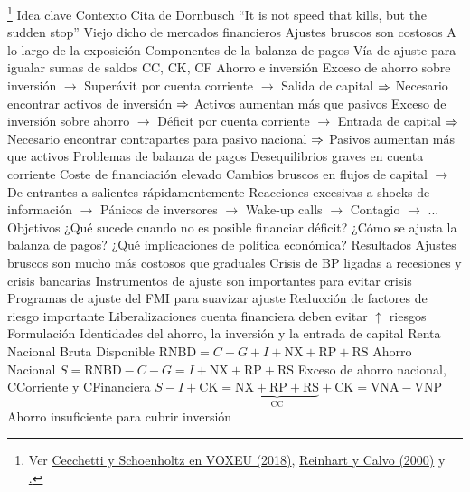 \documentclass{nuevotema}
\begin{document}
\begin{esquemal}
	\1 \footnote{Ver \href{https://voxeu.org/content/sudden-stops-primer-balance-payments-crises}{Cecchetti y Schoenholtz en VOXEU (2018)}, \href{https://mpra.ub.uni-muenchen.de/6982/1/MPRA_paper_6982.pdf}{Reinhart y Calvo (2000)} y \href{https://ideas.repec.org/p/wbk/wbrwps/7639.html} .}
		\2 Idea clave
			\3 Contexto
				\4 Cita de Dornbusch
				\4[] ``It is not speed that kills, but the sudden stop''
				\4[] Viejo dicho de mercados financieros
				\4 Ajustes bruscos son costosos
				\4 A lo largo de la exposición
				\4[] Componentes de la balanza de pagos
				\4[] Vía de ajuste para igualar sumas de saldos CC, CK, CF
				\4 Ahorro e inversión
				\4[] Exceso de ahorro sobre inversión
				\4[] $\to$ Superávit por cuenta corriente
				\4[] $\to$ Salida de capital
				\4[] $\Rightarrow$ Necesario encontrar activos de inversión
				\4[] $\Rightarrow$ Activos aumentan más que pasivos
				\4[] Exceso de inversión sobre ahorro
				\4[] $\to$ Déficit por cuenta corriente
				\4[] $\to$ Entrada de capital
				\4[] $\Rightarrow$ Necesario encontrar contrapartes para pasivo nacional
				\4[] $\Rightarrow$ Pasivos aumentan más que activos
				\4 Problemas de balanza de pagos
				\4[] Desequilibrios graves en cuenta corriente
				\4[] Coste de financiación elevado
				\4[] Cambios bruscos en flujos de capital
				\4[] $\to$ De entrantes a salientes rápidamentemente
				\4[] Reacciones excesivas a shocks de información
				\4[] $\to$ Pánicos de inversores
				\4[] $\to$ Wake-up calls
				\4[] $\to$ Contagio
				\4[] $\to$ ...
			\3 Objetivos
				\4 ¿Qué sucede cuando no es posible financiar déficit?
				\4 ¿Cómo se ajusta la balanza de pagos?
				\4 ¿Qué implicaciones de política económica?
			\3 Resultados
				\4 Ajustes bruscos son mucho más costosos que graduales
				\4 Crisis de BP ligadas a recesiones y crisis bancarias
				\4 Instrumentos de ajuste son importantes para evitar crisis
				\4 Programas de ajuste del FMI para suavizar ajuste
				\4 Reducción de factores de riesgo importante
				\4 Liberalizaciones cuenta financiera deben evitar $\uparrow$ riesgos
		\2 Formulación
			\3 Identidades del ahorro, la inversión y la entrada de capital
				\4 Renta Nacional Bruta Disponible
				\4[] $\text{RNBD} = C+G+I+\text{NX}+ \text{RP}+\text{RS}$
				\4 Ahorro Nacional
				\4[] $S= \text{RNBD} - C -G = I+ \text{NX} + \text{RP}+ \text{RS}$
				\4 Exceso de ahorro nacional, CCorriente y CFinanciera
				\4[] $S-I+\text{CK} = \underbrace{\text{NX}+\text{RP} + \text{RS}}_{\text{CC}} +\text{CK} = \text{VNA} - \text{VNP}$
				\4 Ahorro insuficiente para cubrir inversión

\end{esquemal}
\end{document}
